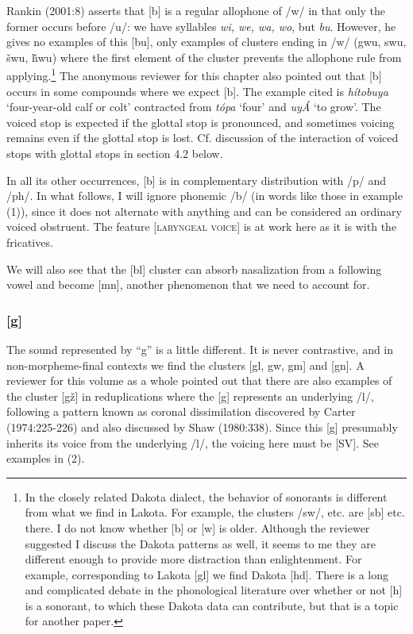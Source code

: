 \documentclass[output=paper]{LSP/langsci}
\begin{document}
Rankin (2001:8) asserts that [b] is a regular allophone of /w/ in that only the former occurs before /u/: we have syllables \textit{wi, we, wa, wo}, but \textit{bu}. However, he gives no examples of this [bu], only examples of clusters ending in /w/ (gwu, swu, \v{s}wu, \v{h}wu) where the first element of the cluster prevents the allophone rule from applying.\footnote{In the closely related Dakota dialect, the behavior of sonorants is different from what we find in Lakota. For example, the clusters /sw/, etc. are [sb] etc. there. I do not know whether [b] or [w] is older. Although the reviewer suggested I discuss the Dakota patterns as well, it seems to me they are different enough to provide more distraction than enlightenment. For example, corresponding to Lakota [gl] we find Dakota [hd]. There is a long and complicated debate in the phonological literature over whether or not [h] is a sonorant, to which these Dakota data can contribute, but that is a topic for another paper.} The anonymous reviewer for this chapter also pointed out that [b] occurs in some compounds where we expect [b]. The example cited is \textit{h\'itobuya} `four-year-old calf or colt' contracted from \textit{t\'opa} `four' and \textit{uy\'A} `to grow'. The voiced stop is expected if the glottal stop is pronounced, and sometimes voicing remains even if the glottal stop is lost. Cf. discussion of the interaction of voiced stops with glottal stops in section 4.2 below.

In all its other occurrences, [b] is in complementary distribution with /p/ and /ph/. In what follows, I will ignore phonemic /b/ (in words like those in example (1)), since it does not alternate with anything and can be considered an ordinary voiced obstruent. The feature [\textsc{laryngeal voice}] is at work here as it is with the fricatives.

We will also see that the [bl] cluster can absorb nasalization from a following vowel and become [mn], another phenomenon that we need to account for.

\subsubsection{[g]}

The sound represented by ``g'' is a little different. It is never contrastive, and in non-morpheme-final contexts we find the clusters [gl, gw, gm] and [gn]. A reviewer for this volume as a whole pointed out that there are also examples of the cluster [g\v{z}] in reduplications where the [g] represents an underlying /l/, following a pattern known as coronal dissimilation discovered by Carter (1974:225-226) and also discussed by Shaw (1980:338).  Since this [g] presumably inherits its voice from the underlying /l/, the voicing here must be [SV].  See examples in (2).
\end{document}
